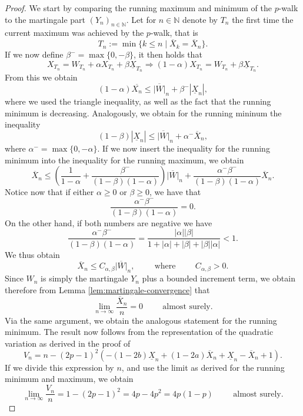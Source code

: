 \documentclass[11pt]{article}
\theoremstyle{remark}
\newcommand{\N}{\mathbb{N}}
\begin{document}
\begin{proof}
    We start by comparing the running maximum and minimum of the $p$-walk to the martingale part $(Y_n)_{n\in\N}$. Let for $n\in\N$ denote by $T_n$ the first time the current maximum was achieved by the $p$-walk, that is
    $$T_n:=\min\{k\leq n\;|\;\overline{X}_k=\overline{X}_n\}.$$
    If we now define $\beta^-=\max\{0,-\beta\}$, it then holds that
    $$X_{T_n}=W_{T_n}+\alpha X_{T_n}+\beta \underline{X}_{T_n}\Rightarrow (1-\alpha)X_{T_n}=W_{T_n}+\beta\underline{X}_{T_n}.$$
    From this we obtain
    $$(1-\alpha)\overline{X_n}\leq \overline{|W|}_n+\beta^-|\underline{X}_n|,$$
    where we used the triangle inequality, as well as the fact that the running minimum is decreasing. Analogously, we obtain for the running mininum the inequality
    $$(1-\beta)|\underline{X}_n|\leq \overline{|W|}_n+\alpha^-\overline{X}_n,$$
    where $\alpha^-=\max\{0,-\alpha\}$. If we now insert the inequality for the running minimum into the inequality for the running maximum, we obtain
    $$\overline{X}_n\leq \left(\frac{1}{1-\alpha}+\frac{\beta^-}{(1-\beta)(1-\alpha)}\right)\overline{|W|}_n+\frac{\alpha^-\beta^-}{(1-\beta)(1-\alpha)}\overline{X}_n.$$
    Notice now that if either $\alpha\geq 0$ or $\beta\geq 0$, we have that
    $$\frac{\alpha^-\beta^-}{(1-\beta)(1-\alpha)}=0.$$
    On the other hand, if both numbers are negative we have
    $$\frac{\alpha^-\beta^-}{(1-\beta)(1-\alpha)}=\frac{|\alpha||\beta|}{1+|\alpha|+|\beta|+|\beta||\alpha|}<1.$$
    We thus obtain
    $$\overline{X}_n\leq C_{\alpha,\beta}\overline{|W|}_n,\hspace{1cm}\text{where}\hspace{1cm}C_{\alpha,\beta}>0.$$
    Since $W_n$ is simply the martingale $Y_n$ plus a bounded increment term, we obtain therefore from Lemma \ref{lem:martingale-convergence} that
    $$\lim_{n\rightarrow\infty}\frac{\overline{X}_n}{n}=0\hspace{1cm}\text{almost surely}.$$
    Via the same argument, we obtain the analogous statement for the running minimum. The result now follows from the representation of the quadratic variation as derived in the proof of \cite[Theorem 2.7.]{HLSH18}
    $$V_n=n-(2p-1)^2\left(-(1-2b)\underline{X}_n+(1-2a)\overline{X}_n+\underline{X}_n-\overline{X}_n+1\right).$$
    If we divide this expression by $n$, and use the limit as derived for the running minimum and maximum, we obtain
    $$\lim_{n\rightarrow\infty}\frac{V_n}{n}=1-(2p-1)^2=4p-4p^2=4p(1-p)\hspace{1cm}\text{almost surely}.$$
\end{proof}
\end{document}
